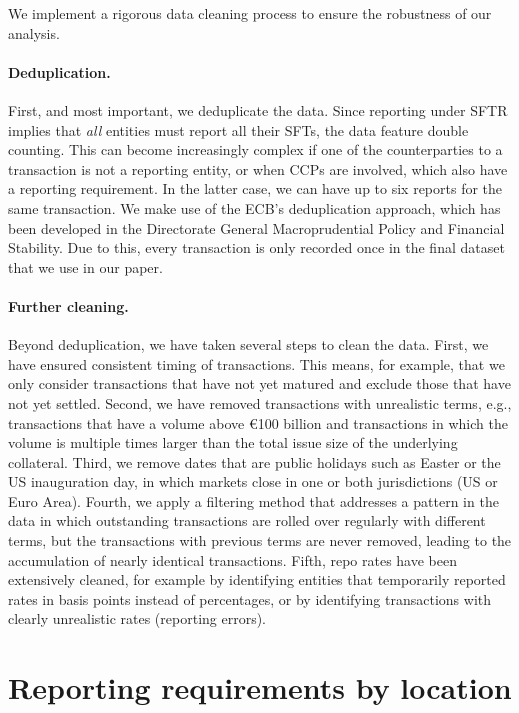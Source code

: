 \documentclass[english, 12pt, oneside]{article}
\begin{document}
We implement a rigorous data cleaning process to ensure the robustness of our analysis.
\paragraph{Deduplication.} First, and most important, we deduplicate the data. Since reporting under SFTR implies that \emph{all} entities must report all their SFTs, the data feature double counting. This can become increasingly complex if one of the counterparties to a transaction is not a reporting entity, or when CCPs are involved, which also have a reporting requirement. In the latter case, we can have up to six reports for the same transaction. We make use of the ECB's deduplication approach, which has been developed in the Directorate General Macroprudential Policy and Financial Stability. Due to this, every transaction is only recorded once in the final dataset that we use in our paper. 
\paragraph{Further cleaning.} Beyond deduplication, we have taken several steps to clean the data. First, we have ensured consistent timing of transactions. This means, for example, that we only consider transactions that have not yet matured and exclude those that have not yet settled.  Second, we have removed transactions with unrealistic terms, e.g., transactions that have a volume above \euro 100 billion and transactions in which the volume is multiple times larger than the total issue size of the underlying collateral. Third, we remove dates that are public holidays such as Easter or the US inauguration day, in which markets close in one or both jurisdictions (US or Euro Area). Fourth, we apply a filtering method that addresses a pattern in the data in which outstanding transactions are rolled over regularly with different terms, but the transactions with previous terms are never removed, leading to the accumulation of nearly identical transactions. Fifth, repo rates have been extensively cleaned, for example by identifying entities that temporarily reported rates in basis points instead of percentages, or by identifying transactions with clearly unrealistic rates (reporting errors). 


\section{Reporting requirements by location}
\label{sec:reporting}
\end{document}
